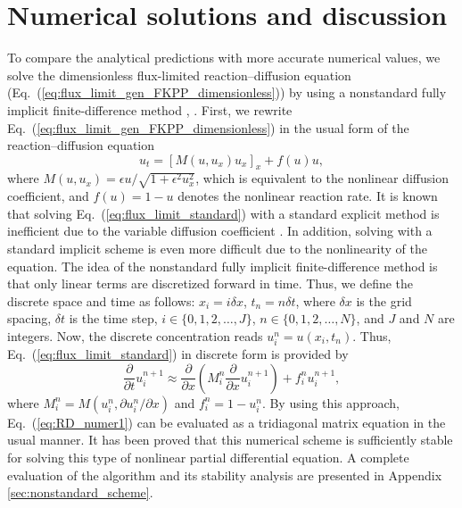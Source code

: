 \documentclass[jkps,preprint,fleqn,showpacs,showkeys]{revtex4}
\newcommand{\eq}[1]{Eq.~(\ref{#1})}
\begin{document}
\section{Numerical solutions and discussion \label{sec:numer}}
To compare the analytical predictions with more accurate numerical values, we solve the dimensionless flux-limited reaction--diffusion equation (\eq{eq:flux_limit_gen_FKPP_dimensionless}) by using a nonstandard fully implicit finite-difference method \cite{Eberl2007}, \cite{Ngamsaad2016}. First, we rewrite \eq{eq:flux_limit_gen_FKPP_dimensionless} in the usual form of the reaction--diffusion equation
\begin{equation}\label{eq:flux_limit_standard}
u_t = \left[M(u,u_x) u_x\right]_x + f(u)u,
\end{equation}
where $M(u,u_x) = \epsilon u/\sqrt{1+\epsilon^2 u_x^2}$, which is equivalent to the nonlinear diffusion coefficient, and $f(u) = 1-u$ denotes the nonlinear reaction rate. It is known that solving \eq{eq:flux_limit_standard} with a standard explicit method is inefficient due to the variable diffusion coefficient \cite{NumericalRecipes}. In addition, solving with a standard implicit scheme is even more difficult due to the nonlinearity of the equation. The idea of the nonstandard fully implicit finite-difference method is that only linear terms are discretized forward in time. Thus, we define the discrete space and time as follows: $x_i = i\delta x$, $t_n=n\delta t$, where $\delta x$ is the grid spacing, $\delta t$ is the time step, $i \in \lbrace0,1,2,\ldots,J\rbrace$, $n \in \lbrace0,1,2,\ldots,N\rbrace$, and $J$ and $N$ are integers. Now, the discrete concentration reads $u^{n}_i = u(x_i,t_n)$. Thus, \eq{eq:flux_limit_standard} in discrete form is provided by
\begin{equation}\label{eq:RD_numer1}
\frac{\partial}{\partial t} u^{n+1}_i \approx \frac{\partial}{\partial x} \left(M^n_i\frac{\partial}{\partial x}u^{n+1}_i\right) + f^n_i u^{n+1}_i,
\end{equation}
where $M^n_i = M(u^{n}_i, \partial u^{n}_i/\partial x)$ and $f^n_i = 1-u^{n}_i$. By using this approach, \eq{eq:RD_numer1} can be evaluated as a tridiagonal matrix equation in the usual manner. It has been proved that this numerical scheme is sufficiently stable for solving this type of nonlinear partial differential equation. A complete evaluation of the algorithm and its stability analysis are presented in Appendix \ref{sec:nonstandard_scheme}. 
\end{document}
